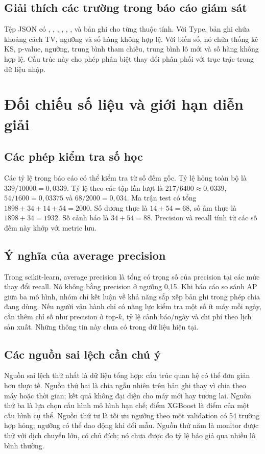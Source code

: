 \section{Giải thích các trường trong báo cáo giám sát}
Tệp JSON có , , , , , ,  và bản ghi  cho từng thuộc tính. Với Type, bản ghi chứa khoảng cách TV, ngưỡng và số hàng không hợp lệ. Với biến số, nó chứa thống kê KS, p-value, ngưỡng, trung bình tham chiếu, trung bình lô mới và số hàng không hợp lệ. Cấu trúc này cho phép phân biệt thay đổi phân phối với trục trặc trong dữ liệu nhập.

\chapter{Đối chiếu số liệu và giới hạn diễn giải}
\section{Các phép kiểm tra số học}
Các tỷ lệ trong báo cáo có thể kiểm tra từ số đếm gốc. Tỷ lệ hỏng toàn bộ là $339/10000=0,0339$. Tỷ lệ theo các tập lần lượt là $217/6400\approx0,0339$, $54/1600=0,03375$ và $68/2000=0,034$. Ma trận test có tổng $1898+34+14+54=2000$. Số dương thực là $14+54=68$, số âm thực là $1898+34=1932$. Số cảnh báo là $34+54=88$. Precision và recall tính từ các số đếm này khớp với metric lưu.

\section{Ý nghĩa của average precision}
Trong scikit-learn, average precision là tổng có trọng số của precision tại các mức thay đổi recall. Nó không bằng precision ở ngưỡng 0,15. Khi báo cáo so sánh AP giữa ba mô hình, nhóm chỉ kết luận về khả năng sắp xếp bản ghi trong phép chia đang dùng. Nếu người vận hành chỉ có năng lực kiểm tra một số ít máy mỗi ngày, cần thêm chỉ số như precision ở top-$k$, tỷ lệ cảnh báo/ngày và chi phí theo lịch sản xuất. Những thông tin này chưa có trong dữ liệu hiện tại.

\section{Các nguồn sai lệch cần chú ý}
Nguồn sai lệch thứ nhất là dữ liệu tổng hợp: cấu trúc quan hệ có thể đơn giản hơn thực tế. Nguồn thứ hai là chia ngẫu nhiên trên bản ghi thay vì chia theo máy hoặc thời gian; kết quả không đại diện cho máy mới hay tương lai. Nguồn thứ ba là lựa chọn cấu hình mô hình hạn chế; điểm XGBoost là điểm của một cấu hình cụ thể. Nguồn thứ tư là tối ưu ngưỡng theo một validation có 54 trường hợp hỏng; ngưỡng có thể dao động khi đổi mẫu. Nguồn thứ năm là monitor được thử với dịch chuyển lớn, có chủ đích; nó chưa được đo tỷ lệ báo giả qua nhiều lô bình thường.

